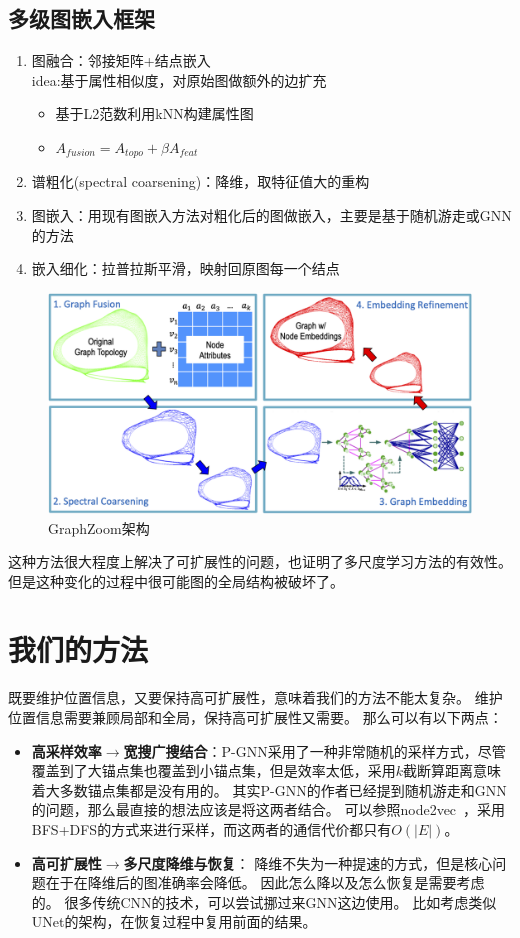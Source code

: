 \documentclass[reportComp]{thesis}
\begin{document}
\subsection{多级图嵌入框架}
\begin{enumerate}
	\item 图融合：邻接矩阵+结点嵌入\\
	idea:基于属性相似度，对原始图做额外的边扩充
	\begin{itemize}
		\item 基于L2范数利用kNN构建属性图
		\item $A_{fusion}=A_{topo}+\beta A_{feat}$
	\end{itemize}
	\item 谱粗化(spectral coarsening)：降维，取特征值大的重构
	\item 图嵌入：用现有图嵌入方法对粗化后的图做嵌入，主要是基于随机游走或GNN的方法
	\item 嵌入细化：拉普拉斯平滑，映射回原图每一个结点
\end{enumerate}
\begin{figure}[H]
\centering
\includegraphics[width=0.8\linewidth]{fig/GraphZoom.png}
\caption{GraphZoom架构}
\end{figure}

这种方法很大程度上解决了可扩展性的问题，也证明了多尺度学习方法的有效性。
但是这种变化的过程中很可能图的全局结构被破坏了。

\section{我们的方法}
既要维护位置信息，又要保持高可扩展性，意味着我们的方法不能太复杂。
维护位置信息需要兼顾局部和全局，保持高可扩展性又需要。
那么可以有以下两点：
\begin{itemize}
\item \textbf{高采样效率$\to$宽搜广搜结合}：P-GNN采用了一种非常随机的采样方式，尽管覆盖到了大锚点集也覆盖到小锚点集，但是效率太低，采用$k$截断算距离意味着大多数锚点集都是没有用的。
其实P-GNN的作者已经提到随机游走和GNN的问题，那么最直接的想法应该是将这两者结合。
可以参照node2vec~\cite{grover:node2vec_kdd_2016}，采用BFS+DFS的方式来进行采样，而这两者的通信代价都只有$O(|E|)$。
\item \textbf{高可扩展性$\to$多尺度降维与恢复}：
降维不失为一种提速的方式，但是核心问题在于在降维后的图准确率会降低。
因此怎么降以及怎么恢复是需要考虑的。
很多传统CNN的技术，可以尝试挪过来GNN这边使用。
比如考虑类似UNet的架构，在恢复过程中复用前面的结果。
\end{itemize}



\end{document}
